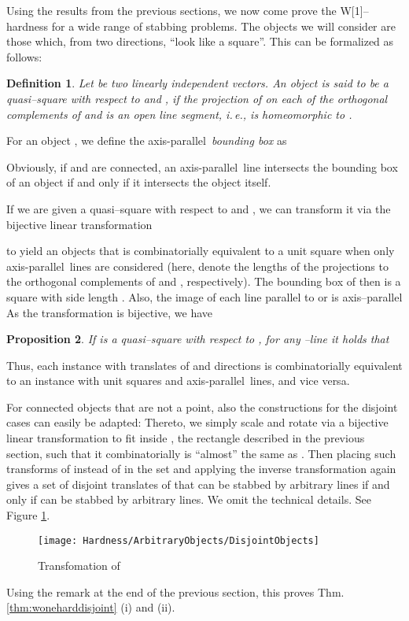 \documentclass[12pt]{article}
\newtheorem{definition}{Definition}
\newtheorem{proposition}[definition]{Proposition}
\newcommand{\cclass}[1]{{#1}}
\newcommand{\wone}{\cclass{W[1]}}
\newcommand{\ap}{a.p.\ }
\renewcommand{\ap}{axis-parallel\ }
\begin{document}
Using the results from the previous sections, we now come prove the \wone--hardness for a wide range of stabbing problems. The objects we will consider are those which, from two directions, ``look like a square''. This can be formalized as follows:
\begin{definition} Let  be two linearly independent vectors. An object  is said to be a \textit{quasi--square} with respect to  and , if the projection of  on each of the orthogonal complements of  and  is an open line segment, i.\,e., is homeomorphic to .
\end{definition}
For an object , we define the \ap \emph{bounding box } as

Obviously, if  and  are connected, an \ap line intersects the bounding box of an object if and only if it intersects the object itself. 

If we are given a quasi--square with respect to  and , we can transform it via the bijective linear transformation

to yield an objects that is combinatorially equivalent to a unit square when only \ap lines are considered (here,  denote the lengths of the projections to the orthogonal complements of  and , respectively).
The bounding box of  then is a square with side length . Also, the image of each line parallel to  or  is axis--parallel As the transformation is bijective, we have 
\begin{proposition}\label{Proposition:BoundingBox} If  is a quasi--square with respect to , for any  --line  it holds that
 
\end{proposition}
Thus, each instance with translates of  and directions  is combinatorially equivalent to an instance with unit squares and \ap lines, and vice versa.

For connected objects that are not a point, also the constructions for the disjoint cases can easily be adapted: Thereto, we simply scale and rotate  via a bijective linear transformation to fit inside , the rectangle described in the previous section, such that it combinatorially is ``almost'' the same as . Then placing such transforms of  instead of  in the set  and applying the inverse transformation again gives a set of disjoint translates of  that can be stabbed by  arbitrary lines if and only if  can be stabbed by  arbitrary lines. We omit the technical details. See Figure \ref{fig:DisjointObjects}.
\begin{figure}[htbp]
	\centering
		\texttt{[image: Hardness/ArbitraryObjects/DisjointObjects]}
		\caption{Transfomation of }
	\label{fig:DisjointObjects}
\end{figure}
Using the remark at the end of the previous section, this proves Thm. \ref{thm:woneharddisjoint} (i) and (ii).
\end{document}
